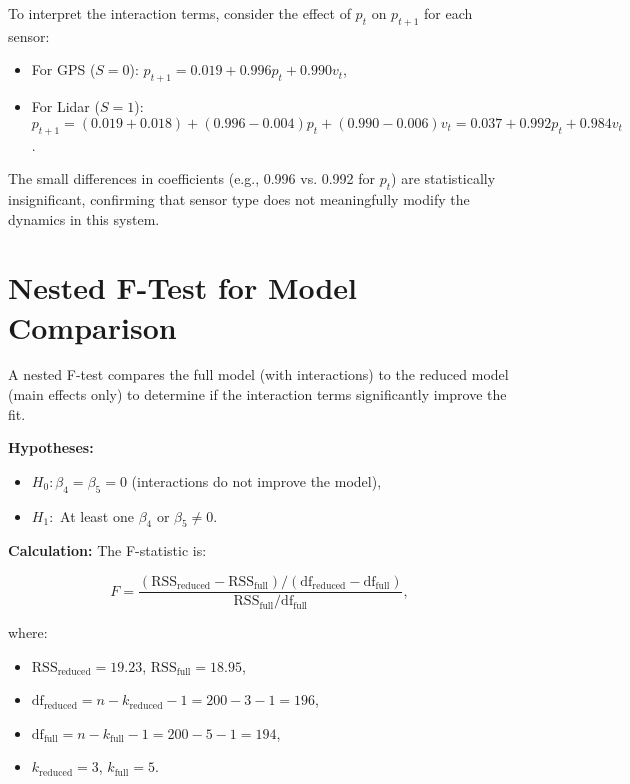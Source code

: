 \documentclass[12pt]{article}
\begin{document}
To interpret the interaction terms, consider the effect of \( p_t \) on \( p_{t+1} \) for each sensor:
\begin{itemize}
    \item For GPS (\( S = 0 \)): \( p_{t+1} = 0.019 + 0.996 p_t + 0.990 v_t \),
    \item For Lidar (\( S = 1 \)): \( p_{t+1} = (0.019 + 0.018) + (0.996 - 0.004) p_t + (0.990 - 0.006) v_t = 0.037 + 0.992 p_t + 0.984 v_t \).
\end{itemize}

The small differences in coefficients (e.g., 0.996 vs. 0.992 for \( p_t \)) are statistically insignificant, confirming that sensor type does not meaningfully modify the dynamics in this system.

\section{Nested F-Test for Model Comparison}
\label{sec:nested_f_test}

A nested F-test compares the full model (with interactions) to the reduced model (main effects only) to determine if the interaction terms significantly improve the fit.

\textbf{Hypotheses:}
\begin{itemize}
    \item \( H_0: \beta_4 = \beta_5 = 0 \) (interactions do not improve the model),
    \item \( H_1: \) At least one \( \beta_4 \) or \( \beta_5 \neq 0 \).
\end{itemize}

\textbf{Calculation:}
The F-statistic is:

\begin{equation}
    F = \frac{(\text{RSS}_{\text{reduced}} - \text{RSS}_{\text{full}}) / (\text{df}_{\text{reduced}} - \text{df}_{\text{full}})}{\text{RSS}_{\text{full}} / \text{df}_{\text{full}}},
    \label{eq:f_statistic}
\end{equation}

where:
\begin{itemize}
    \item \( \text{RSS}_{\text{reduced}} = 19.23 \), \( \text{RSS}_{\text{full}} = 18.95 \),
    \item \( \text{df}_{\text{reduced}} = n - k_{\text{reduced}} - 1 = 200 - 3 - 1 = 196 \),
    \item \( \text{df}_{\text{full}} = n - k_{\text{full}} - 1 = 200 - 5 - 1 = 194 \),
    \item \( k_{\text{reduced}} = 3 \), \( k_{\text{full}} = 5 \).
\end{itemize}
\end{document}
